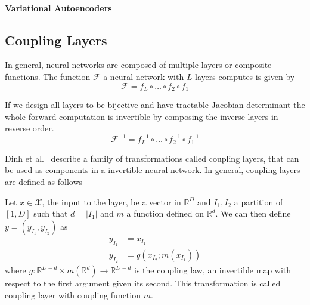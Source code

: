\paragraph{Variational Autoencoders}%
\label{par:variational_autoencoders}

\subsection{Coupling Layers}%
\label{sub:coupling_layers}

In general, neural networks are composed of multiple layers or composite
functions. The function $\mathcal{F}$ a neural network with $L$ layers computes
is given by
\begin{equation}%
    \label{eq:neural_network}
    \mathcal{F} = f_L \circ \dots \circ f_2 \circ f_1
\end{equation}

If we design all layers to be bijective and have tractable Jacobian determinant the whole
forward computation is invertible by composing the inverse layers in reverse
order.
\begin{equation}%
    \label{eq:neural_network_inv}
    \mathcal{F}^{-1} = f_L^{-1} \circ \dots \circ f_2^{-1} \circ f_1^{-1}
\end{equation}

Dinh et al.\ \citep{dinhNICENonlinearIndependent2015} describe a family of transformations
called coupling layers, that can be used as components in a invertible neural
network. In general, coupling layers are defined as follows

\begin{definition}
    Let $x \in \mathcal{X}$, the input to the layer, be a vector in $\mathbb{R}^D$
    and $I_1, I_2$ a partition of $[1, D]$ such that $d = |I_1|$ and $m$ a
    function defined on $\mathbb{R}^d$. We can then define $y = (y_{I_1},
    y_{I_2})$ as
    \begin{equation}
        \begin{aligned}%
            \label{eq:coupling_layer_transform}
            y_{I_1} &= x_{I_1} \\
            y_{I_2} &= g(x_{I_2};m(x_{I_1}))
        \end{aligned}
    \end{equation}
    where $g: \mathbb{R}^{D-d} \times m(\mathbb{R}^d) \rightarrow
    \mathbb{R}^{D-d}$ is the coupling law, an invertible map with respect to
    the first argument given its second. This transformation is called coupling
    layer with coupling function $m$.
\end{definition}

